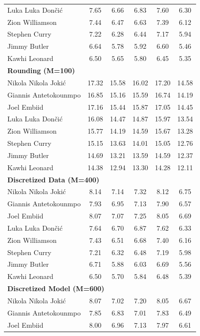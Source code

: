 \documentclass[11pt,a4paper]{article}
\begin{document}
\begin{table}[H]
\begin{tabular}{lccccc}
Luka Luka Don\v{c}i\'{c} & 7.65 & 6.66 & 6.83 & 7.60 & 6.30 \\
Zion Williamson & 7.44 & 6.47 & 6.63 & 7.39 & 6.12 \\
Stephen Curry & 7.22 & 6.28 & 6.44 & 7.17 & 5.94 \\
Jimmy Butler & 6.64 & 5.78 & 5.92 & 6.60 & 5.46 \\
Kawhi Leonard & 6.50 & 5.65 & 5.80 & 6.45 & 5.35 \\
\midrule
\multicolumn{6}{l}{\textbf{Rounding (M=100)}} \\
\midrule
Nikola Nikola Joki\'{c} & 17.32 & 15.58 & 16.02 & 17.20 & 14.58 \\
Giannis Antetokounmpo & 16.85 & 15.16 & 15.59 & 16.74 & 14.19 \\
Joel Embiid & 17.16 & 15.44 & 15.87 & 17.05 & 14.45 \\
Luka Luka Don\v{c}i\'{c} & 16.08 & 14.47 & 14.87 & 15.97 & 13.54 \\
Zion Williamson & 15.77 & 14.19 & 14.59 & 15.67 & 13.28 \\
Stephen Curry & 15.15 & 13.63 & 14.01 & 15.05 & 12.76 \\
Jimmy Butler & 14.69 & 13.21 & 13.59 & 14.59 & 12.37 \\
Kawhi Leonard & 14.38 & 12.94 & 13.30 & 14.28 & 12.11 \\
\midrule
\multicolumn{6}{l}{\textbf{Discretized Data (M=400)}} \\
\midrule
Nikola Nikola Joki\'{c} & 8.14 & 7.14 & 7.32 & 8.12 & 6.75 \\
Giannis Antetokounmpo & 7.93 & 6.95 & 7.13 & 7.90 & 6.57 \\
Joel Embiid & 8.07 & 7.07 & 7.25 & 8.05 & 6.69 \\
Luka Luka Don\v{c}i\'{c} & 7.64 & 6.70 & 6.87 & 7.62 & 6.33 \\
Zion Williamson & 7.43 & 6.51 & 6.68 & 7.40 & 6.16 \\
Stephen Curry & 7.21 & 6.32 & 6.48 & 7.19 & 5.98 \\
Jimmy Butler & 6.71 & 5.88 & 6.03 & 6.69 & 5.56 \\
Kawhi Leonard & 6.50 & 5.70 & 5.84 & 6.48 & 5.39 \\
\midrule
\multicolumn{6}{l}{\textbf{Discretized Model (M=600)}} \\
\midrule
Nikola Nikola Joki\'{c} & 8.07 & 7.02 & 7.20 & 8.05 & 6.67 \\
Giannis Antetokounmpo & 7.85 & 6.83 & 7.01 & 7.83 & 6.49 \\
Joel Embiid & 8.00 & 6.96 & 7.13 & 7.97 & 6.61 \\

\end{tabular}
\end{table}
\end{document}
